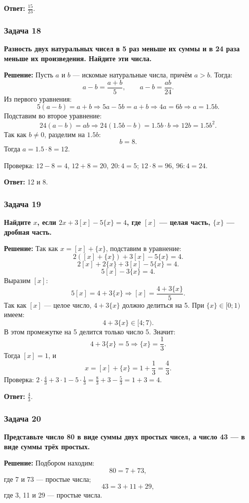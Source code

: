 \documentclass[12pt, a4paper]{article}
\begin{document}
\textbf{Ответ:} $\frac{15}{23}$.

\subsubsection*{Задача 18}
\textbf{Разность двух натуральных чисел в 5 раз меньше их суммы и в 24 раза меньше их произведения. Найдите эти числа.}

\textbf{Решение:}
Пусть $a$ и $b$ — искомые натуральные числа, причём $a > b$. Тогда:
\[
a - b = \frac{a+b}{5}, \qquad a - b = \frac{ab}{24}.
\]
Из первого уравнения:
\[
5(a-b) = a+b \Rightarrow 5a - 5b = a + b \Rightarrow 4a = 6b \Rightarrow a = 1.5b.
\]
Подставим во второе уравнение:
\[
24(a-b) = ab \Rightarrow 24(1.5b - b) = 1.5b \cdot b \Rightarrow 12b = 1.5b^2.
\]
Так как $b \neq 0$, разделим на $1.5b$:
\[
b = 8.
\]
Тогда $a = 1.5 \cdot 8 = 12$.

Проверка: $12 - 8 = 4$, $12 + 8 = 20$, $20 : 4 = 5$; $12 \cdot 8 = 96$, $96 : 4 = 24$.

\textbf{Ответ:} 12 и 8.

\subsubsection*{Задача 19}
\textbf{Найдите $x$, если $2x + 3[x] - 5\{x\} = 4$, где $[x]$ — целая часть, $\{x\}$ — дробная часть.}

\textbf{Решение:}
Так как $x = [x] + \{x\}$, подставим в уравнение:
\[
2([x] + \{x\}) + 3[x] - 5\{x\} = 4.
\]
\[
2[x] + 2\{x\} + 3[x] - 5\{x\} = 4.
\]
\[
5[x] - 3\{x\} = 4.
\]
Выразим $[x]$:
\[
5[x] = 4 + 3\{x\} \Rightarrow [x] = \frac{4 + 3\{x\}}{5}.
\]
Так как $[x]$ — целое число, $4 + 3\{x\}$ должно делиться на 5. При $\{x\} \in [0; 1)$ имеем:
\[
4 + 3\{x\} \in [4; 7).
\]
В этом промежутке на 5 делится только число 5. Значит:
\[
4 + 3\{x\} = 5 \Rightarrow \{x\} = \frac{1}{3}.
\]
Тогда $[x] = 1$, и
\[
x = [x] + \{x\} = 1 + \frac{1}{3} = \frac{4}{3}.
\]
Проверка: $2 \cdot \frac{4}{3} + 3 \cdot 1 - 5 \cdot \frac{1}{3} = \frac{8}{3} + 3 - \frac{5}{3} = 1 + 3 = 4$.

\textbf{Ответ:} $\frac{4}{3}$.

\subsubsection*{Задача 20}
\textbf{Представьте число 80 в виде суммы двух простых чисел, а число 43 — в виде суммы трёх простых.}

\textbf{Решение:}
Подбором находим:
\[
80 = 7 + 73,
\]
где 7 и 73 — простые числа;
\[
43 = 3 + 11 + 29,
\]
где 3, 11 и 29 — простые числа.
\end{document}
